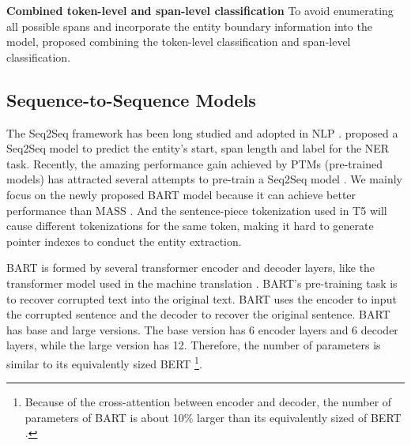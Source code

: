 \documentclass[11pt,a4paper]{article}
\begin{document}
\textbf{Combined token-level and span-level classification} To avoid enumerating all possible spans and incorporate the entity boundary information into the model, \citet{DBLP:conf/emnlp/WangL19,DBLP:conf/emnlp/ZhengCXLX19,DBLP:conf/acl/LinLHS19,DBLP:conf/emnlp/WangLTZ20,DBLP:conf/acl/LuoZ20} proposed combining the token-level classification and span-level classification.



\subsection{Sequence-to-Sequence Models}
The Seq2Seq framework has been long studied and adopted in NLP \citep{DBLP:conf/nips/SutskeverVL14,DBLP:conf/emnlp/ChoMGBBSB14,DBLP:conf/emnlp/LuongPM15,vaswani2017attention,DBLP:conf/nips/VinyalsFJ15}. \citet{DBLP:conf/naacl/GillickBVS16} proposed a Seq2Seq model to predict the entity's start, span length and label for the NER task. Recently, the amazing performance gain achieved by PTMs (pre-trained models) \citep{DBLP:journals/corr/abs-2003-08271,DBLP:conf/naacl/PetersNIGCLZ18,DBLP:conf/naacl/DevlinCLT19,DBLP:journals/corr/abs-2104-04986,DBLP:journals/tacl/YanQH20} has attracted several attempts to pre-train a Seq2Seq model \citep{DBLP:conf/icml/SongTQLL19,DBLP:conf/acl/LewisLGGMLSZ20,DBLP:journals/jmlr/RaffelSRLNMZLL20}. We mainly focus on the newly proposed BART \citep{DBLP:conf/acl/LewisLGGMLSZ20} model because it can achieve better performance than MASS \citep{DBLP:conf/icml/SongTQLL19}. And the sentence-piece tokenization used in T5 \citep{DBLP:journals/jmlr/RaffelSRLNMZLL20} will cause different tokenizations for the same token, making it hard to generate pointer indexes to conduct the entity extraction. 

BART is formed by several transformer encoder and decoder layers, like the transformer model used in the machine translation \citep{vaswani2017attention}. BART's pre-training task is to recover corrupted text into the original text. BART uses the encoder to input the corrupted sentence and the decoder to recover the original sentence. BART has base and large versions. The base version has 6 encoder layers and 6 decoder layers, while the large version has 12. Therefore, the number of parameters is similar to its equivalently sized BERT \footnote{Because of the cross-attention between encoder and decoder, the number of parameters of BART is about 10\% larger than its equivalently sized of BERT \citep{DBLP:conf/acl/LewisLGGMLSZ20}.}.
\end{document}
